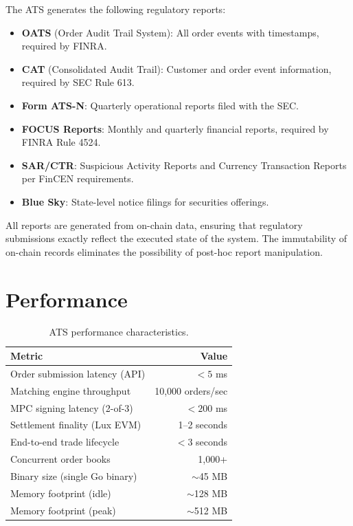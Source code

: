 \documentclass[11pt,a4paper]{article}
\begin{document}
The ATS generates the following regulatory reports:

\begin{itemize}[nosep]
  \item \textbf{OATS} (Order Audit Trail System): All order events with timestamps, required by FINRA.
  \item \textbf{CAT} (Consolidated Audit Trail): Customer and order event information, required by SEC Rule 613.
  \item \textbf{Form ATS-N}: Quarterly operational reports filed with the SEC.
  \item \textbf{FOCUS Reports}: Monthly and quarterly financial reports, required by FINRA Rule 4524.
  \item \textbf{SAR/CTR}: Suspicious Activity Reports and Currency Transaction Reports per FinCEN requirements.
  \item \textbf{Blue Sky}: State-level notice filings for securities offerings.
\end{itemize}

All reports are generated from on-chain data, ensuring that regulatory submissions exactly reflect the executed state of the system. The immutability of on-chain records eliminates the possibility of post-hoc report manipulation.

\section{Performance}\label{sec:performance}

\begin{table}[H]
\centering
\caption{ATS performance characteristics.}
\label{tab:performance}
\begin{tabular}{lr}
\toprule
\textbf{Metric} & \textbf{Value} \\
\midrule
Order submission latency (API) & $< 5$ ms \\
Matching engine throughput & 10,000 orders/sec \\
MPC signing latency (2-of-3) & $< 200$ ms \\
Settlement finality (Lux EVM) & 1--2 seconds \\
End-to-end trade lifecycle & $< 3$ seconds \\
Concurrent order books & 1,000+ \\
Binary size (single Go binary) & $\sim$45 MB \\
Memory footprint (idle) & $\sim$128 MB \\
Memory footprint (peak) & $\sim$512 MB \\
\bottomrule
\end{tabular}
\end{table}
\end{document}
